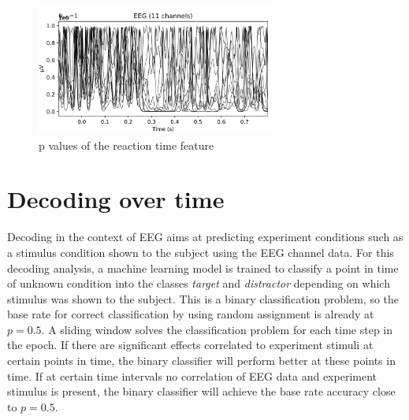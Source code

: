 \documentclass[a4paper]{article}
\begin{document}
\begin{figure}[tbh!] 
  \centering
     \includegraphics[width=0.7\textwidth]{mrPval.png}
  \caption{p values of the reaction time feature}
  \label{fig:mrPval.png}
\end{figure}


\section{Decoding over time}
\label{sec:decoding}
Decoding in the context of EEG aims at predicting experiment conditions such as a stimulus condition shown to the subject using the EEG channel data.
For this decoding analysis, a machine learning model is trained to classify a point in time of unknown condition into the classes \textit{target} and \textit{distractor} depending on which stimulus was shown to the subject.
This is a binary classification problem, so the base rate for correct classification by using random assignment is already at $p=0.5$.
A sliding window solves the classification problem for each time step in the epoch.
If there are significant effects correlated to experiment stimuli at certain points in time, the binary classifier will perform better at these points in time.
If at certain time intervals no correlation of EEG data and experiment stimulus is present, the binary classifier will achieve the base rate accuracy close to $p=0.5$.
\end{document}
